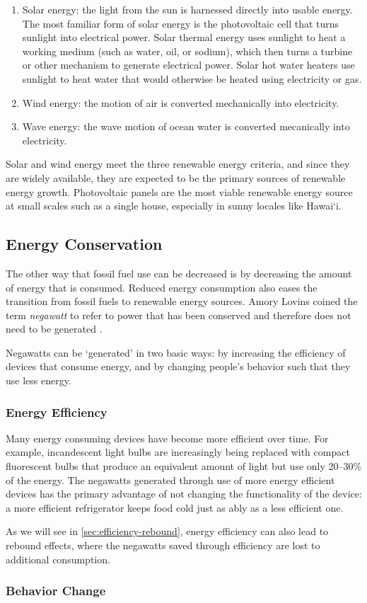 \begin{enumerate}

\item Solar energy: the light from the sun is harnessed directly into usable energy. The most familiar form of solar energy is the photovoltaic cell that turns sunlight into electrical power. Solar thermal energy uses sunlight to heat a working medium (such as water, oil, or sodium), which then turns a turbine or other mechanism to generate electrical power. Solar hot water heaters use sunlight to heat water that would otherwise be heated using electricity or gas.

\item Wind energy: the motion of air is converted mechanically into electricity.

\item Wave energy: the wave motion of ocean water is converted mecanically into electricity.

\end{enumerate}

Solar and wind energy meet the three renewable energy criteria, and since they are widely available, they are expected to be the primary sources of renewable energy growth. Photovoltaic panels are the most viable renewable energy source at small scales such as a single house, especially in sunny locales like Hawai`i.

\subsection{Energy Conservation}

The other way that fossil fuel use can be decreased is by decreasing the amount of energy that is consumed. Reduced energy consumption also eases the transition from fossil fuels to renewable energy sources. Amory Lovins coined the term \emph{negawatt} to refer to power that has been conserved and therefore does not need to be generated \cite{Kolbert2007Mr-Green}.

Negawatts can be `generated' in two basic ways: by increasing the efficiency of devices that consume energy, and by changing people's behavior such that they use less energy.

\subsubsection{Energy Efficiency}

Many energy consuming devices have become more efficient over time. For example, incandescent light bulbs are increasingly being replaced with compact fluorescent bulbs that produce an equivalent amount of light but use only 20--30\% of the energy. The negawatts generated through use of more energy efficient devices has the primary advantage of not changing the functionality of the device: a more efficient refrigerator keeps food cold just as ably as a less efficient one.

As we will see in \autoref{sec:efficiency-rebound}, energy efficiency can also lead to rebound effects, where the negawatts saved through efficiency are lost to additional consumption.

\subsubsection{Behavior Change}